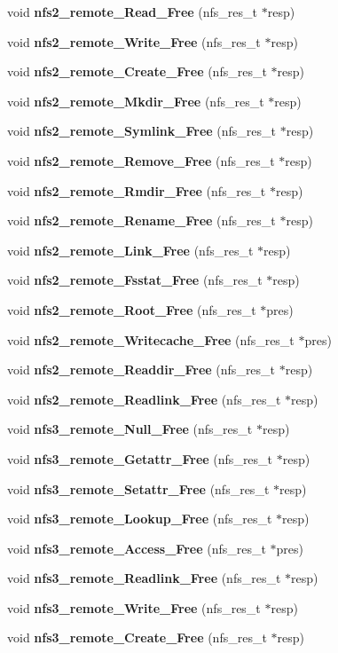 \begin{CompactItemize}
\item 
void {\bf nfs2\_\-remote\_\-Read\_\-Free} (nfs\_\-res\_\-t $\ast$resp)
\item 
void {\bf nfs2\_\-remote\_\-Write\_\-Free} (nfs\_\-res\_\-t $\ast$resp)
\item 
void {\bf nfs2\_\-remote\_\-Create\_\-Free} (nfs\_\-res\_\-t $\ast$resp)
\item 
void {\bf nfs2\_\-remote\_\-Mkdir\_\-Free} (nfs\_\-res\_\-t $\ast$resp)
\item 
void {\bf nfs2\_\-remote\_\-Symlink\_\-Free} (nfs\_\-res\_\-t $\ast$resp)
\item 
void {\bf nfs2\_\-remote\_\-Remove\_\-Free} (nfs\_\-res\_\-t $\ast$resp)
\item 
void {\bf nfs2\_\-remote\_\-Rmdir\_\-Free} (nfs\_\-res\_\-t $\ast$resp)
\item 
void {\bf nfs2\_\-remote\_\-Rename\_\-Free} (nfs\_\-res\_\-t $\ast$resp)
\item 
void {\bf nfs2\_\-remote\_\-Link\_\-Free} (nfs\_\-res\_\-t $\ast$resp)
\item 
void {\bf nfs2\_\-remote\_\-Fsstat\_\-Free} (nfs\_\-res\_\-t $\ast$resp)
\item 
void {\bf nfs2\_\-remote\_\-Root\_\-Free} (nfs\_\-res\_\-t $\ast$pres)
\item 
void {\bf nfs2\_\-remote\_\-Writecache\_\-Free} (nfs\_\-res\_\-t $\ast$pres)
\item 
void {\bf nfs2\_\-remote\_\-Readdir\_\-Free} (nfs\_\-res\_\-t $\ast$resp)
\item 
void {\bf nfs2\_\-remote\_\-Readlink\_\-Free} (nfs\_\-res\_\-t $\ast$resp)
\item 
void {\bf nfs3\_\-remote\_\-Null\_\-Free} (nfs\_\-res\_\-t $\ast$resp)
\item 
void {\bf nfs3\_\-remote\_\-Getattr\_\-Free} (nfs\_\-res\_\-t $\ast$resp)
\item 
void {\bf nfs3\_\-remote\_\-Setattr\_\-Free} (nfs\_\-res\_\-t $\ast$resp)
\item 
void {\bf nfs3\_\-remote\_\-Lookup\_\-Free} (nfs\_\-res\_\-t $\ast$resp)
\item 
void {\bf nfs3\_\-remote\_\-Access\_\-Free} (nfs\_\-res\_\-t $\ast$pres)
\item 
void {\bf nfs3\_\-remote\_\-Readlink\_\-Free} (nfs\_\-res\_\-t $\ast$resp)
\item 
void {\bf nfs3\_\-remote\_\-Write\_\-Free} (nfs\_\-res\_\-t $\ast$resp)
\item 
void {\bf nfs3\_\-remote\_\-Create\_\-Free} (nfs\_\-res\_\-t $\ast$resp)

\end{CompactItemize}
